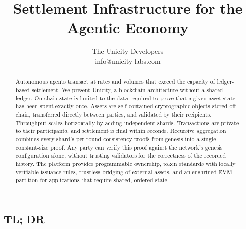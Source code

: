 \documentclass{article}
\title{Settlement Infrastructure for the Agentic Economy}
\author{The Unicity Developers\\info@unicity-labs.com}
\date{} %
\begin{document}
\maketitle
\thispagestyle{titleheader}

\begin{abstract}

Autonomous agents transact at rates and volumes that exceed the capacity of ledger-based settlement. We present Unicity, a blockchain architecture without a shared ledger. On-chain state is limited to the data required to prove that a given asset state has been spent exactly once. Assets are self-contained cryptographic objects stored off-chain, transferred directly between parties, and validated by their recipients. Throughput scales horizontally by adding independent shards. Transactions are private to their participants, and settlement is final within seconds. Recursive aggregation combines every shard's per-round consistency proofs from genesis into a single constant-size proof. Any party can verify this proof against the network's genesis configuration alone, without trusting validators for the correctness of the recorded history. The platform provides programmable ownership, token standards with locally verifiable issuance rules, trustless bridging of external assets, and an enshrined EVM partition for applications that require shared, ordered state.

\end{abstract}

\subsection*{TL; DR}
\end{document}
